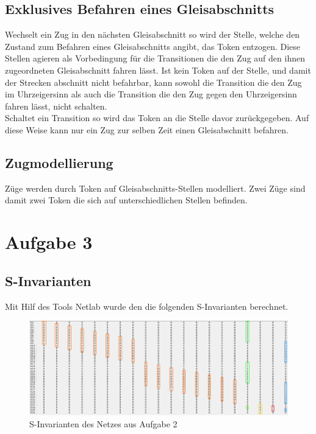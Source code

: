 \documentclass[10pt]{scrartcl}
\begin{document}
\subsection{Exklusives Befahren eines Gleisabschnitts}
Wechselt ein Zug in den nächsten Gleisabschnitt so wird der Stelle, welche den Zustand zum Befahren eines Gleisabschnitts angibt, das Token entzogen.
Diese Stellen agieren als Vorbedingung für die Transitionen die den Zug auf den ihnen zugeordneten Gleisabschnitt fahren lässt.
Ist kein Token auf der Stelle, und damit der Strecken abschnitt nicht befahrbar, kann sowohl die Transition die den Zug im Uhrzeigersinn als auch die Transition die den Zug gegen den Uhrzeigersinn fahren lässt, nicht schalten.\\
Schaltet ein Transition so wird das Token an die Stelle davor zurückgegeben.
Auf diese Weise kann nur ein Zug zur selben Zeit einen Gleisabschnitt befahren.

\subsection{Zugmodellierung}
Züge werden durch Token auf Gleisabschnitts-Stellen modelliert.
Zwei Züge sind damit zwei Token die sich auf unterschiedlichen Stellen befinden.

\section{Aufgabe 3}

\subsection{S-Invarianten}
Mit Hilf des Tools Netlab wurde den die folgenden S-Invarianten berechnet.

\begin{figure}[htbp]
	\centering	\includegraphics[width=1.0\textwidth]{Bilder/s_invarianten.png}
	\caption{S-Invarianten des Netzes aus Aufgabe 2}
	\label{fig:s_invarianten}
\end{figure}
\end{document}
